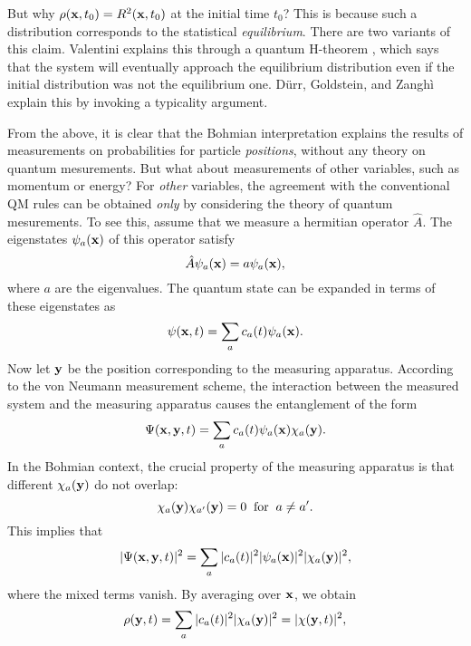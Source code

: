 \documentclass[12pt]{article} %
\begin{document}
But why $\rho({\bf x},t_0)=R^2({\bf x},t_0)$ at the initial time $t_0$?
This is because such a distribution  
corresponds to the statistical {\em equilibrium}. 
There are two variants of this claim.  
Valentini explains this through a quantum H-theorem \cite{val}, 
which says that the system will eventually approach the equilibrium 
distribution even if the initial distribution was not the 
equilibrium one.   
D\"urr, Goldstein, and Zangh\`i \cite{durr1,durr2} explain this by invoking 
a typicality argument. 

From the above, it is clear that the
Bohmian interpretation explains the results of measurements 
on probabilities for particle {\em positions}, without any 
theory on quantum mesurements. 
But what about measurements of other variables, such as 
momentum or energy? 
For {\em other} variables, the agreement with the conventional QM rules 
can be obtained {\em only} by considering the theory of quantum mesurements.
To see this, 
assume that we measure a hermitian operator $\hat{A}$. The eigenstates 
$\psi_a({\bf x})$ of this operator satisfy
\begin{equation}
\hat{A}\psi_a({\bf x})=a\psi_a({\bf x}) ,
\end{equation}
where $a$ are the eigenvalues.
The quantum state can be expanded in terms of these eigenstates as
\begin{equation}
\psi({\bf x},t)=\sum_a c_a(t)\psi_a({\bf x}) .
\end{equation}
Now let
${\bf y}$ be the position corresponding to the measuring apparatus.
According to the von Neumann measurement scheme, the interaction 
between the measured system and the measuring apparatus causes 
the entanglement of the form
\begin{equation}
\Psi({\bf x},{\bf y},t)=\sum_a c_a(t)\psi_a({\bf x})\chi_a({\bf y}) .
\end{equation}
In the Bohmian context, the crucial property
of the measuring apparatus is that different $\chi_a({\bf y})$ 
do not overlap:
\begin{equation}
\chi_a({\bf y})\chi_{a'}({\bf y})=0 \;\;{\rm for}\;\; a\neq a' .
\end{equation}
This implies that
\begin{equation}
|\Psi({\bf x},{\bf y},t)|^2=\sum_a |c_a(t)|^2 |\psi_a({\bf x})|^2 
|\chi_a({\bf y})|^2 ,
\end{equation}
where the mixed terms vanish.
By averaging over ${\bf x}$, we obtain
\begin{equation}\label{yt}
\rho({\bf y},t)=\sum_a |c_a(t)|^2 |\chi_a({\bf y})|^2=|\chi({\bf y},t)|^2 ,
\end{equation} 
\end{document}

